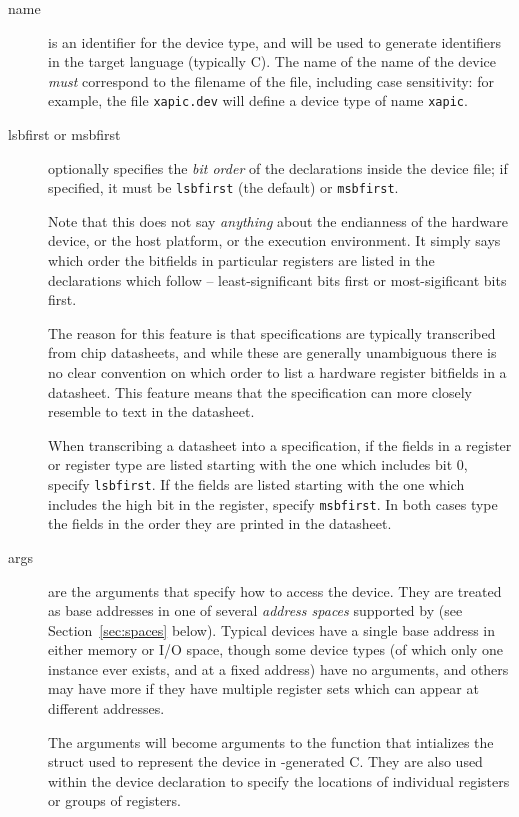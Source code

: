 \documentclass[a4paper,11pt,twoside]{report}
\begin{document}
\begin{description}
\item[name] is an identifier for the device type, and will be used to
  generate identifiers in the target language (typically C).  
  The name of the name of the device \emph{must} correspond to the
  filename of the file, including case sensitivity: for example, 
  the file \texttt{xapic.dev} will define a device type
  of name \texttt{xapic}. 

\item[lsbfirst or msbfirst] optionally specifies the \emph{bit order}
  of the declarations 
  inside the device file; if specified, it must be \texttt{lsbfirst}
  (the default) or \texttt{msbfirst}.  

  Note that this does not say \emph{anything} about the endianness of
  the hardware device, or the host platform, or the execution
  environment.  It simply says which order the bitfields in particular
  registers are listed in the declarations which follow --
  least-significant bits first or most-sigificant bits first. 

  The reason for this feature is that \Mac specifications are
  typically transcribed from chip datasheets, and while these are
  generally unambiguous there is no clear convention on which order to
  list a hardware register bitfields in a datasheet.   This feature 
  means that the \Mac specification can more closely resemble to text
  in the datasheet.  

  When transcribing a datasheet into a \Mac specification, if the
  fields in a register or register type are listed starting with the
  one which includes bit 0, specify \texttt{lsbfirst}.   If the fields
  are listed starting with the one which includes the high bit in the
  register, specify \texttt{msbfirst}.  In both cases type the fields
  in the order they are printed in the datasheet. 

\item[args] are the arguments that specify how to access the device.
  They are treated as base addresses in one of several \emph{address
    spaces} supported by \Mac (see Section~\ref{sec:spaces}
  below).  Typical devices have a single base address in either memory
  or I/O space, though some device types (of which only one instance
  ever exists, and at a fixed address) have no arguments, and others
  may have more if they have multiple register sets which can appear
  at different addresses.   

  The arguments will become arguments to the function that intializes
  the struct used to represent the device in \Mac-generated C.
  They are also used within the device declaration to specify the
  locations of individual registers or groups of registers. 


\end{description}
\end{document}

